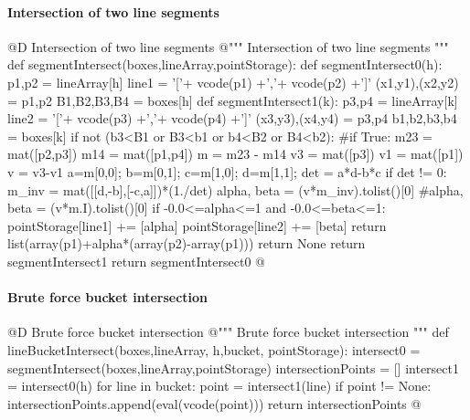 \documentclass[11pt,oneside]{article}    %
\begin{document}
\paragraph{Intersection of two line segments}
@D Intersection of two line segments
@{""" Intersection of two line segments """
def segmentIntersect(boxes,lineArray,pointStorage):
    def segmentIntersect0(h):
        p1,p2 = lineArray[h]
        line1 = '['+ vcode(p1) +','+ vcode(p2) +']'
        (x1,y1),(x2,y2) = p1,p2
        B1,B2,B3,B4 = boxes[h]
        def segmentIntersect1(k):
            p3,p4 = lineArray[k]
            line2 = '['+ vcode(p3) +','+ vcode(p4) +']'
            (x3,y3),(x4,y4) = p3,p4
            b1,b2,b3,b4 = boxes[k]
            if not (b3<B1 or B3<b1 or b4<B2 or B4<b2):
            #if True:
                m23 = mat([p2,p3])
                m14 = mat([p1,p4])
                m = m23 - m14
                v3 = mat([p3])
                v1 = mat([p1])
                v = v3-v1
                a=m[0,0]; b=m[0,1]; c=m[1,0]; d=m[1,1];
                det = a*d-b*c
                if det != 0:
                    m_inv = mat([[d,-b],[-c,a]])*(1./det)
                    alpha, beta = (v*m_inv).tolist()[0]
                    #alpha, beta = (v*m.I).tolist()[0]
                    if -0.0<=alpha<=1 and -0.0<=beta<=1:
                        pointStorage[line1] += [alpha]
                        pointStorage[line2] += [beta]
                        return list(array(p1)+alpha*(array(p2)-array(p1)))
            return None
        return segmentIntersect1
    return segmentIntersect0
@}


\paragraph{Brute force bucket intersection}
@D Brute force bucket intersection
@{""" Brute force bucket intersection """
def lineBucketIntersect(boxes,lineArray, h,bucket, pointStorage):
    intersect0 = segmentIntersect(boxes,lineArray,pointStorage)
    intersectionPoints = []
    intersect1 = intersect0(h)
    for line in bucket:
        point = intersect1(line)
        if point != None: 
            intersectionPoints.append(eval(vcode(point)))
    return intersectionPoints
@}
\end{document}
